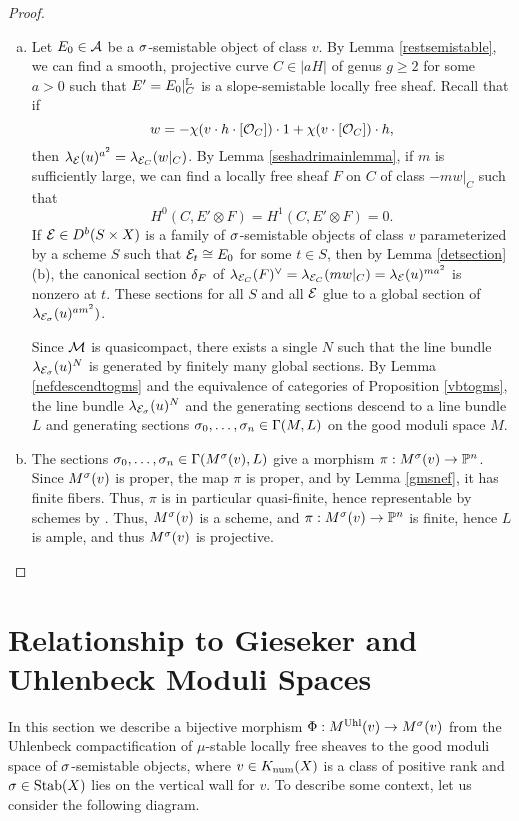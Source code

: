 \documentclass[letterpaper,11pt]{amsart}%
\theoremstyle{remark}
\begin{document}
\begin{proof}
    \begin{enumerate}[(a)]
        \item Let $E_0 \in \mathcal{A}$ be a $\sigma$-semistable object of class $v$. By Lemma \ref{restsemistable}, we can find a smooth, projective curve $C \in |aH|$ of genus $g \ge 2$ for some $a > 0$ such that $E' = E_0|_C^{\mathbb{L}}$ is a slope-semistable locally free sheaf. Recall that if 
        \[ w = -\chi(v \cdot h \cdot [\mathcal{O}_C]) \cdot 1 + \chi(v \cdot [\mathcal{O}_C]) \cdot h, \]
        then $\lambda_{\mathcal{E}}(u)^{a^2} = \lambda_{\mathcal{E}_C}(w|_C)$. By Lemma \ref{seshadrimainlemma}, if $m$ is sufficiently large, we can find a locally free sheaf $F$ on $C$ of class $-m w|_C$ such that
        \[ H^0(C, E' \otimes F) = H^1(C, E' \otimes F) = 0. \]
        If $\mathcal{E} \in D^b(S \times X)$ is a family of $\sigma$-semistable objects of class $v$ parameterized by a scheme $S$ such that $\mathcal{E}_t \cong E_0$ for some $t \in S$, then by Lemma \ref{detsection} (b), the canonical section $\delta_F$ of $\lambda_{\mathcal{E}_C}(F)^\vee = \lambda_{\mathcal{E}_C}(m w|_C) = \lambda_{\mathcal{E}}(u)^{m a^2}$ is nonzero at $t$. These sections for all $S$ and all $\mathcal{E}$ glue to a global section of $\lambda_{\mathcal{E}_\sigma}(u)^{a m^2})$. 
        
        Since $\mathcal{M}$ is quasicompact, there exists a single $N$ such that the line bundle $\lambda_{\mathcal{E}_\sigma}(u)^N$ is generated by finitely many global sections. By Lemma \ref{nefdescendtogms} and the equivalence of categories of Proposition \ref{vbtogms}, the line bundle $\lambda_{\mathcal{E}_\sigma}(u)^N$ and the generating sections descend to a line bundle $L$ and generating sections $\sigma_0,\ldots,\sigma_n \in \Gamma(M, L)$ on the good moduli space $M$. 
        
        \item The sections $\sigma_0, \ldots, \sigma_n \in \Gamma(M^\sigma(v), L)$ give a morphism $\pi: M^\sigma(v) \to \mathbb{P}^n$. Since $M^\sigma(v)$ is proper, the map $\pi$ is proper, and by Lemma \ref{gmsnef}, it has finite fibers. Thus, $\pi$ is in particular quasi-finite, hence representable by schemes by \cite[Theorem 7.2.10]{olsson}. Thus, $M^\sigma(v)$ is a scheme, and $\pi: M^\sigma(v) \to \mathbb{P}^n$ is finite, hence $L$ is ample, and thus $M^\sigma(v)$ is projective.
    \end{enumerate}
\end{proof}
\fi


\section{Relationship to Gieseker and Uhlenbeck Moduli Spaces}
In this section we describe a bijective morphism $\Phi: M^{\mathrm{Uhl}}(v) \to M^\sigma(v)$ from the Uhlenbeck compactification of $\mu$-stable locally free sheaves to the good moduli space of $\sigma$-semistable objects, where $v \in K_{\mathrm{num}}(X)$ is a class of positive rank and $\sigma \in \operatorname{\mathrm{Stab}}(X)$ lies on the vertical wall for $v$. To describe some context, let us consider the following diagram.
\end{document}
